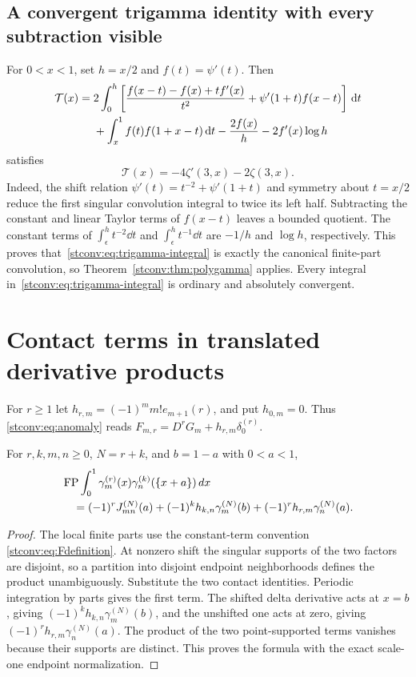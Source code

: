 \subsection{A convergent trigamma identity with every subtraction visible}
For $0<x<1$, set $h=x/2$ and $f(t)=\psi'(t)$. Then
\begin{align}
 \mathcal T(x)={}&2\int_0^h\left[
       \frac{f(x-t)-f(x)+tf'(x)}{t^2}
        +\psi'(1+t)f(x-t)\right]\,\mathrm d t\label{stconv:eq:trigamma-integral}\\
 &+\int_x^1f(t)f(1+x-t)\,\mathrm d t
      -\frac{2f(x)}h-2f'(x)\log h\notag
\end{align}
satisfies
\begin{equation}\label{stconv:eq:trigamma-value}
 \mathcal T(x)=-4\zeta'(3,x)-2\zeta(3,x).
\end{equation}
Indeed, the shift relation $\psi'(t)=t^{-2}+\psi'(1+t)$ and symmetry
about $t=x/2$ reduce the first singular convolution integral to twice
its left half. Subtracting the constant and linear Taylor terms of
$f(x-t)$ leaves a bounded quotient. The constant terms of
$\int_\epsilon^ht^{-2}\dd t$ and
$\int_\epsilon^ht^{-1}\dd t$ are $-1/h$ and $\log h$,
respectively. This proves that~\eqref{stconv:eq:trigamma-integral} is exactly
the canonical finite-part convolution, so Theorem~\ref{stconv:thm:polygamma}
applies. Every integral in~\eqref{stconv:eq:trigamma-integral} is ordinary and
absolutely convergent.



\section{Contact terms in translated derivative products}
\label{stconv:sec:translated-contact}
For $r\ge1$ let $h_{r,m}=(-1)^m m!e_{m+1}(r)$, and put $h_{0,m}=0$.
Thus \eqref{stconv:eq:anomaly} reads
$F_{m,r}=D^rG_m+h_{r,m}\delta_0^{(r)}$.
\begin{theorem}\label{shj:contactthm}
For $r,k,m,n\ge0$, $N=r+k$, and $b=1-a$ with $0<a<1$,
\begin{align}\label{shj:generalcontact}
 &\operatorname{FP}\int_0^1\gamma_m^{(r)}(x)\gamma_n^{(k)}(\{x+a\})\,dx\notag\\
 &\quad=(-1)^r J_{mn}^{(N)}(a)
 +(-1)^k h_{k,n}\gamma_m^{(N)}(b)
 +(-1)^r h_{r,m}\gamma_n^{(N)}(a).
\end{align}
\end{theorem}
\begin{proof}
The local finite parts use the constant-term convention
\eqref{stconv:eq:Fdefinition}. At nonzero shift the singular supports
of the two factors are disjoint, so a partition into disjoint endpoint
neighborhoods defines the product unambiguously. Substitute the two contact
identities. Periodic integration by parts gives the first term. The
shifted delta derivative acts at $x=b$, giving
$(-1)^k h_{k,n}\gamma_m^{(N)}(b)$, and the unshifted one acts at zero,
giving $(-1)^r h_{r,m}\gamma_n^{(N)}(a)$. The product of the two
point-supported terms vanishes because their supports are distinct.
This proves the formula with the exact scale-one endpoint normalization.
\end{proof}
